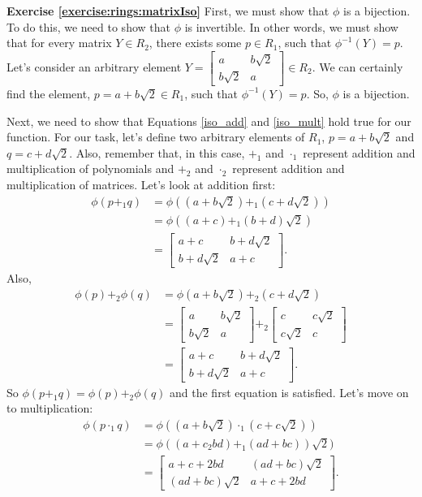 \noindent\textbf{Exercise \ref{exercise:rings:matrixIso}}
First, we must show that $\phi$ is a bijection.  To do this, we need to show that $\phi$ is invertible.  In other words, we must show that for every matrix $Y\in R_2$, there exists some $p\in R_1$, such that $\phi^{-1}(Y)=p$.  Let's consider an arbitrary element $Y=
\begin{bmatrix}
a & b \sqrt{2}\\
b \sqrt{2} & a
\end{bmatrix}
\in R_2$.  We can certainly find the element, $p=a+b\sqrt{2}\in R_1$, such that $\phi^{-1}(Y)=p$.  So, $\phi$ is a bijection.

Next, we need to show that Equations \eqref{iso_add} and \ref{iso_mult} hold true for our function.  For our task, let's define two arbitrary elements of $R_1$, $p=a+b\sqrt{2}$ and $q=c+d\sqrt{2}$. Also, remember that, in this case, $+_1$ and $\cdot_1$ represent addition and multiplication of polynomials and $+_2$ and $\cdot_2$ represent addition and multiplication of matrices.  Let's look at addition first:
\begin{align*}
\phi(p+_1q)&=\phi((a+b\sqrt{2})+_1(c+d\sqrt{2}))\\
&=\phi((a+c)+_1(b+d)\sqrt{2})\\
&=
\begin{bmatrix}
a+c & b+d \sqrt{2}\\
b+d \sqrt{2} & a+c
\end{bmatrix}.
\end{align*}
Also,
\begin{align*}
\phi(p)+_2\phi(q)&=\phi(a+b\sqrt{2})+_2(c+d\sqrt{2})\\
&=
\begin{bmatrix}
a & b \sqrt{2}\\
b \sqrt{2} & a
\end{bmatrix} +_2
\begin{bmatrix}
c & c \sqrt{2}\\
c \sqrt{2} & c
\end{bmatrix}\\
&=
\begin{bmatrix}
a+c & b+d \sqrt{2}\\
b+d \sqrt{2} & a+c
\end{bmatrix}.
\end{align*}
So $\phi(p+_1q)=\phi(p)+_2\phi(q)$ and the first equation is satisfied.  Let's move on to multiplication:
\begin{align*}
\phi(p\cdot_1q)&=\phi((a+b\sqrt{2})\cdot_1(c+c\sqrt{2}))\\
&=\phi((a+c_2bd)+_1(ad+bc))\sqrt{2})\\
&=
\begin{bmatrix}
a+c+2bd & (ad+bc) \sqrt{2}\\
(ad+bc) \sqrt{2} & a+c+2bd
\end{bmatrix}.
\end{align*}
